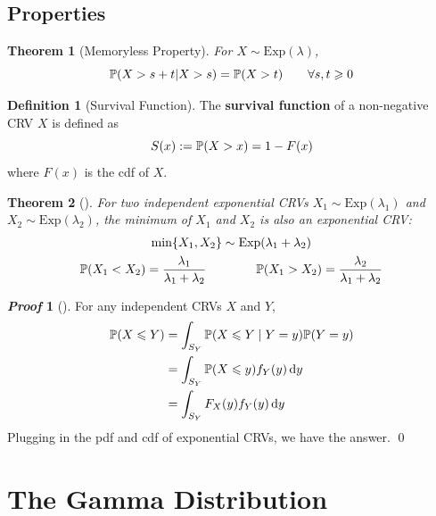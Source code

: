 \documentclass[10pt,UTF8]{article}
\newenvironment{definition box}
{\begin{tcolorbox}[colback=blue!5!white,colframe=blue!75!black,parbox=false,before upper=\par,before lower=\par]}
{\end{tcolorbox}}
\newenvironment{theorem box}
{\begin{tcolorbox}[colback=yellow!5!white,colframe=yellow!75!black,parbox=false,before upper=\par,before lower=\par]}
{\end{tcolorbox}}
\theoremstyle{definition}
\newtheorem{definition inner}{Definition}[section]
\newenvironment{definition}[1][]
{\begin{definition box}\begin{definition inner}[#1]\hfill\par}
{\end{definition inner}\end{definition box}}
\theoremstyle{plain}
\newtheorem{theorem inner}{Theorem}[section]
\newenvironment{theorem}[1][]
{\begin{theorem box}\begin{theorem inner}[#1]\hfill\par}
{\end{theorem inner}\end{theorem box}}
\theoremstyle{definition}
\newtheorem*{proof inner}{\textit{Proof}}
\renewenvironment{proof}[1][]
{\begin{proof inner}[#1]\hfill\par}
{\qed\end{proof inner}}
\theoremstyle{remark}
\newcommand{\Prob}{\mathbb{P}\qty}
\begin{document}
\subsection{Properties}

\begin{theorem}[Memoryless Property]
    For $X\sim\mathrm{Exp}(\lambda)$,
    \begin{equation*}
        \Prob(X > s+t | X > s) = \Prob(X > t)
        \qquad\forall s,t\geqslant 0
    \end{equation*}
\end{theorem}

\begin{definition}[Survival Function]
    The \textbf{survival function} of a non-negative CRV $X$ is defined as
    \begin{equation*}
        S(x) := \Prob(X > x) = 1 - F(x)
    \end{equation*}
    where $F(x)$ is the cdf of $X$.
\end{definition}

\begin{theorem}
    For two independent exponential CRVs $X_1\sim\mathrm{Exp}(\lambda_1)$
    and $X_2\sim\mathrm{Exp}(\lambda_2)$,
    the minimum of $X_1$ and $X_2$ is also an exponential CRV:
    \begin{gather*}
        \min\{X_1, X_2\} \sim\mathrm{Exp}(\lambda_1+\lambda_2) \\
        \Prob(X_1 < X_2) = \frac{\lambda_1}{\lambda_1+\lambda_2}
        \qquad\qquad
        \Prob(X_1 > X_2) = \frac{\lambda_2}{\lambda_1+\lambda_2}
    \end{gather*}
\end{theorem}
\begin{proof}
    For any independent CRVs $X$ and $Y$,
    \begin{align*}
        \Prob(X \leqslant Y) &=
        \int_{S_Y} \Prob(X \leqslant Y\mid Y = y)\Prob(Y=y) \\
        &= \int_{S_Y} \Prob(X \leqslant y)f_{Y}(y)\dd{y} \\
        &= \int_{S_Y} F_{X}(y)f_{Y}(y)\dd{y}
    \end{align*}
    Plugging in the pdf and cdf of exponential CRVs,
    we have the answer.
\end{proof}



\section{The Gamma Distribution}
\end{document}
